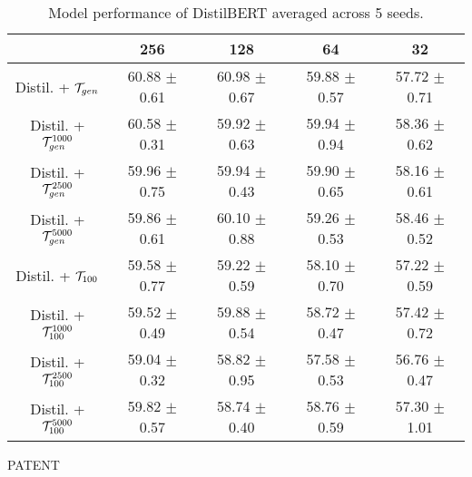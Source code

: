 \begin{table*}[t]
\begin{subtable}{\textwidth}
\begin{tabular}{ccccc}
                                                    & \textbf{256}  & \textbf{128}   & \textbf{64}   & \textbf{32}  \\ 
            
            \hline
    
            Distil. + $\mathcal{T}_{gen}$                     & 60.88 $\pm$ 0.61      & 60.98 $\pm$ 0.67      & 59.88 $\pm$ 0.57      & 57.72 $\pm$ 0.71  \\
            Distil. + $\mathcal{T}_{gen}^{1000}$              & 60.58 $\pm$ 0.31      & 59.92 $\pm$ 0.63      & 59.94 $\pm$ 0.94      & 58.36 $\pm$ 0.62  \\
            Distil. + $\mathcal{T}_{gen}^{2500}$              & 59.96 $\pm$ 0.75      & 59.94 $\pm$ 0.43      & 59.90 $\pm$ 0.65      & 58.16 $\pm$ 0.61  \\
            Distil. + $\mathcal{T}_{gen}^{5000}$              & 59.86 $\pm$ 0.61      & 60.10 $\pm$ 0.88      & 59.26 $\pm$ 0.53      & 58.46 $\pm$ 0.52  \\
            Distil. + $\tok100$                     & 59.58 $\pm$ 0.77      & 59.22 $\pm$ 0.59      & 58.10 $\pm$ 0.70      & 57.22 $\pm$ 0.59  \\
            Distil. + $\tok100^{1000}$              & 59.52 $\pm$ 0.49      & 59.88 $\pm$ 0.54      & 58.72 $\pm$ 0.47      & 57.42 $\pm$ 0.72  \\
            Distil. + $\tok100^{2500}$              & 59.04 $\pm$ 0.32      & 58.82 $\pm$ 0.95      & 57.58 $\pm$ 0.53      & 56.76 $\pm$ 0.47  \\
            Distil. + $\tok100^{5000}$              & 59.82 $\pm$ 0.57      & 58.74 $\pm$ 0.40      & 58.76 $\pm$ 0.59      & 57.30 $\pm$ 1.01  \\
            
            \hline
        \end{tabular}
        \caption{PATENT}
    \end{subtable}

    \caption{Model performance of DistilBERT averaged across 5 seeds.}
    \label{table:distilbert}
\end{table*}
